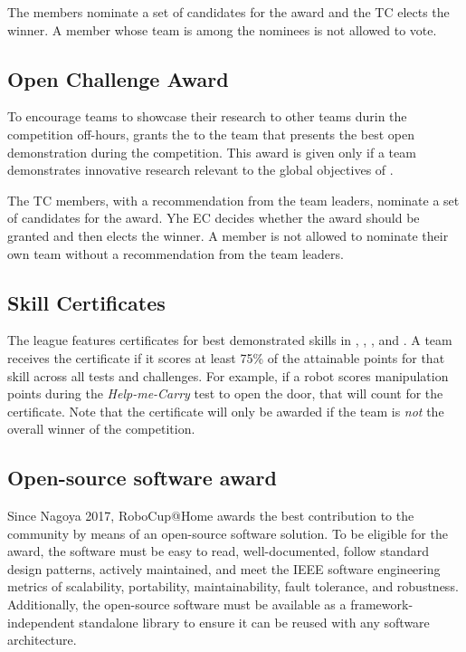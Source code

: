 The \AtHome{} \EC{} members nominate a set of candidates for the award and the TC elects the winner.
A \TC{} member whose team is among the nominees is not allowed to vote.

\subsection{Open Challenge Award}\label{award:oc}

To encourage teams to showcase their research to other teams durin the competition off-hours, \AtHome{} grants the \OCAward{} to the team that presents the best open demonstration during the competition.
This award is given only if a team demonstrates innovative research relevant to the global objectives of \AtHome{}.

The \AtHome{} TC members, with a recommendation from the team leaders, nominate a set of candidates for the award. Yhe EC decides whether the award should be granted and then elects the winner.
A \TC{} member is not allowed to nominate their own team without a recommendation from the team leaders.

\subsection{Skill Certificates}\label{award:skill}

The \AtHome{} league features certificates for best demonstrated skills in \NAV{}, \MAN{}, \PerRec{}, and \NLP{}.
A team receives the certificate if it scores at least 75\% of the attainable points for that skill across all tests and challenges. 
For example, if a robot scores manipulation points during the \emph{Help-me-Carry} test to open the door, that will count for the \MAN{} certificate.
Note that the certificate will only be awarded if the team is \emph{not} the overall winner of the competition.

\subsection{Open-source software award}\label{award:oss}

Since Nagoya 2017, RoboCup@Home awards the best contribution to the community by means of an open-source software solution.
To be eligible for the award, the software must be easy to read, well-documented, follow standard design patterns, actively maintained, and meet the IEEE software engineering metrics of scalability, portability, maintainability, fault tolerance, and robustness.
Additionally, the open-source software must be available as a framework-independent standalone library to ensure it can be reused with any software architecture.


